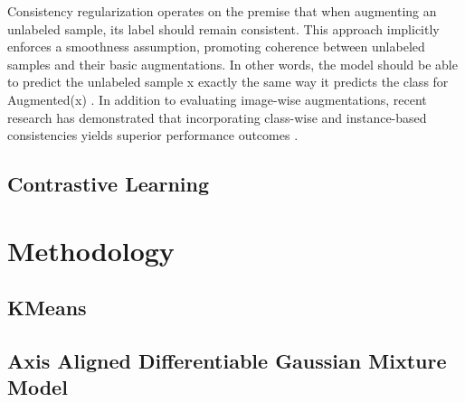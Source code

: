 \documentclass[10pt,twocolumn,letterpaper]{article}
\begin{document}
Consistency regularization operates on the premise that when augmenting an unlabeled sample, its label should remain consistent. 
This approach implicitly enforces a smoothness assumption, promoting coherence between unlabeled samples and their basic augmentations. 
In other words, the model should be able to predict the unlabeled sample x exactly the same way it predicts the class for Augmented(x) \cite{berthelot2019mixmatch,sohn2020fixmatch,berthelot2019remixmatch,mustafa2020transformation}. 
In addition to evaluating image-wise augmentations, recent research has demonstrated that incorporating class-wise and instance-based consistencies yields superior performance outcomes \cite{zheng2022simmatch,li2021comatch}.

\subsection{Contrastive Learning}


%
%	
%		


\section{Methodology}

\subsection{KMeans}

\subsection{Axis Aligned Differentiable Gaussian Mixture Model}
\end{document}
